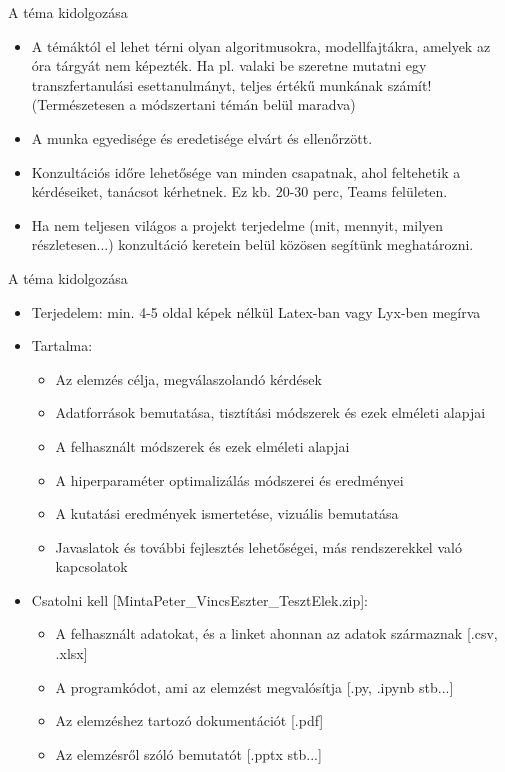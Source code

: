 \documentclass[english, aspectratio=169]{beamer}
\begin{document}
\begin{frame}{A téma kidolgozása}
\begin{itemize}
	\item A témáktól el lehet térni olyan algoritmusokra, modellfajtákra, amelyek az óra tárgyát nem képezték. Ha pl. valaki be szeretne mutatni egy transzfertanulási esettanulmányt, teljes értékű munkának számít! (Természetesen a módszertani témán belül maradva)
	\item A munka egyedisége és eredetisége elvárt és ellenőrzött.
	\item Konzultációs időre lehetősége van minden csapatnak, ahol feltehetik a kérdéseiket, tanácsot kérhetnek. Ez kb. 20-30 perc, Teams felületen.
	\item Ha nem teljesen világos a projekt terjedelme (mit, mennyit, milyen részletesen...) konzultáció keretein belül közösen segítünk meghatározni.
\end{itemize}
\end{frame}

\begin{frame}{A téma kidolgozása}
\begin{itemize}
	\item Terjedelem: min. 4-5 oldal képek nélkül Latex-ban vagy Lyx-ben megírva\par\smallskip
	\item Tartalma:
	\begin{itemize}
		\item Az elemzés célja, megválaszolandó kérdések
		\item Adatforrások bemutatása, tisztítási módszerek és ezek elméleti alapjai
		\item A felhasznált módszerek és ezek elméleti alapjai
		\item A hiperparaméter optimalizálás módszerei és eredményei
		\item A kutatási eredmények ismertetése, vizuális bemutatása
		\item Javaslatok és további fejlesztés lehetőségei, más rendszerekkel való kapcsolatok
	\end{itemize}\par\smallskip
	\item Csatolni kell [MintaPeter\_VincsEszter\_TesztElek.zip]:
	\begin{itemize}
		\item A felhasznált adatokat, és a linket ahonnan az adatok származnak [.csv, .xlsx]
		\item A programkódot, ami az elemzést megvalósítja [.py, .ipynb stb...]
		\item Az elemzéshez tartozó dokumentációt [.pdf]
		\item Az elemzésről szóló bemutatót [.pptx stb...]
	\end{itemize}
\end{itemize}
\end{frame}
\end{document}
